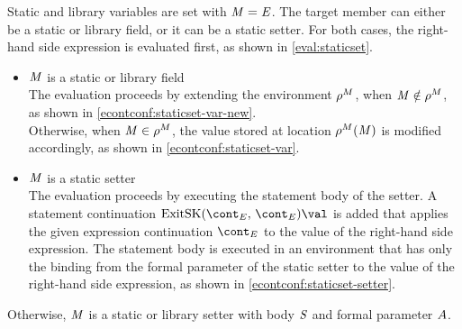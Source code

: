 \documentclass{article}
\begin{document}
\noindent
Static and library variables are set with $\mathit{M}=\mathit{E}$.
The target member can either be a static or library field, or it can be a static setter. For both cases, the right-hand side expression is evaluated first, as shown in \eqref{eval:staticset}.
\begin{itemize}
\item $\mathit{M}$ is a static or library field\\
The evaluation proceeds by extending the environment $\rho^{M}$, when $\mathit{M} \notin \rho^{M}$, as shown in \eqref{econtconf:staticset-var-new}.\\
\noindent
Otherwise, when $\mathit{M} \in \rho^{M}$, the value stored at location $\rho^{M}(\mathit{M})$ is modified accordingly, as shown in \eqref{econtconf:staticset-var}.
\item $\mathit{M}$ is a static setter\\
The evaluation proceeds by executing the statement body of the setter. A statement continuation $\ExitSK{\econt}{\val}$ is added that applies the given expression continuation $\econt$ to the value of the right-hand side expression.
The statement body is executed in an environment that has only the binding from the formal parameter of the static setter to the value of the right-hand side expression, as shown in \eqref{econtconf:staticset-setter}.
\end{itemize}
\noindent
Otherwise, $\mathit{M}$ is a static or library setter with body $\mathit{S}$ and formal parameter $A$.
\end{document}
